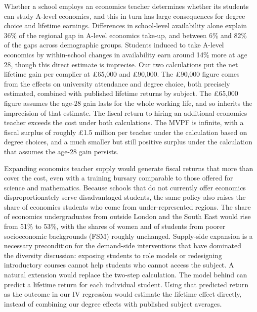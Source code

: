 Whether a school employs an economics teacher determines whether its students can study A-level economics, and this in turn has large consequences for degree choice and lifetime earnings. Differences in school-level availability alone explain 36\% of the regional gap in A-level economics take-up, and between 6\% and 82\% of the gaps across demographic groups. Students induced to take A-level economics by within-school changes in availability earn around 14\% more at age 28, though this direct estimate is imprecise. Our two calculations put the net lifetime gain per complier at \pounds 65,000 and \pounds 90,000. The \pounds 90,000 figure comes from the effects on university attendance and degree choice, both precisely estimated, combined with published lifetime returns by subject. The \pounds 65,000 figure assumes the age-28 gain lasts for the whole working life, and so inherits the imprecision of that estimate. The fiscal return to hiring an additional economics teacher exceeds the cost under both calculations. The MVPF is infinite, with a fiscal surplus of roughly \pounds 1.5 million per teacher under the calculation based on degree choices, and a much smaller but still positive surplus under the calculation that assumes the age-28 gain persists.

Expanding economics teacher supply would generate fiscal returns that more than cover the cost, even with a training bursary comparable to those offered for science and mathematics. Because schools that do not currently offer economics disproportionately serve disadvantaged students, the same policy also raises the share of economics students who come from under-represented regions. The share of economics undergraduates from outside London and the South East would rise from 51\% to 53\%, with the shares of women and of students from poorer socioeconomic backgrounds (FSM) roughly unchanged. Supply-side expansion is a necessary precondition for the demand-side interventions that have dominated the diversity discussion: exposing students to role models or redesigning introductory courses cannot help students who cannot access the subject. A natural extension would replace the two-step calculation. The model behind \citet{britton2026lifetime} can predict a lifetime return for each individual student. Using that predicted return as the outcome in our IV regression would estimate the lifetime effect directly, instead of combining our degree effects with published subject averages.

\FloatBarrier

